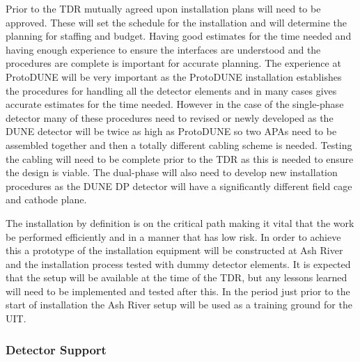 Prior to the TDR mutually agreed upon installation plans will need to
be approved. These will set the schedule for the installation and will
determine the planning for staffing and budget. Having good estimates
for the time needed and having enough experience to ensure the
interfaces are understood and the procedures are complete is important
for accurate planning. The experience at ProtoDUNE will be very
important as the ProtoDUNE installation establishes the procedures for
handling all the detector elements and in many cases gives accurate
estimates for the time needed. However in the case of the single-phase
detector many of these procedures need to revised or newly developed
as the DUNE detector will be twice as high as ProtoDUNE so two APAs
need to be assembled together and then a totally different cabling scheme is
needed. Testing the cabling will need to be complete prior to the TDR
as this is needed to ensure the design is viable. The dual-phase will
also need to develop new installation procedures as the DUNE DP
detector will have a significantly different field cage and cathode
plane.

The installation by definition is on the critical path making it vital
that the work be performed efficiently and in a manner that has low
risk. In order to achieve this a prototype of the installation
equipment will be constructed at Ash River and the installation
process tested with dummy detector elements. It is expected that the
setup will be available at the time of the TDR, but any lessons
learned will need to be implemented and tested after this. In the
period just prior to the start of installation the Ash River setup
will be used as a training ground for the UIT.


\subsubsection{Detector Support}


